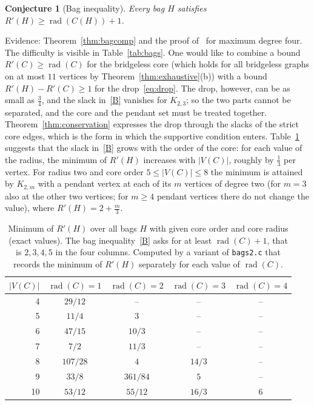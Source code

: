 \documentclass[11pt]{amsart}
\newtheorem{conjecture}[theorem]{Conjecture}
\theoremstyle{definition}
\DeclareMathOperator{\rad}{rad}
\newcommand{\Rp}{R'}
\begin{document}
\begin{conjecture}[Bag inequality]\label{conj:bag}
Every bag $H$ satisfies $\Rp(H)\ge\rad(C(H))+1$.
\end{conjecture}

Evidence: Theorem~\ref{thm:bagcomp} and the proof of~\cite{CPS} for maximum degree four. The difficulty is visible in
Table~\ref{tab:bags}. One would like to combine a bound $\Rp(C)\ge\rad(C)$ for the bridgeless core (which holds for all
bridgeless graphs on at most $11$ vertices by Theorem~\ref{thm:exhaustive}(b)) with a bound $\Rp(H)-\Rp(C)\ge1$ for the
drop~\eqref{eq:drop}. The drop, however, can be as small as $\frac34$, and the slack in~\eqref{B} vanishes for
$K_{2,3}$; so the two parts cannot be separated, and the core and the pendant set must be treated together.
Theorem~\ref{thm:conservation} expresses the drop through the slacks of the strict core edges, which is the form in which
the supportive condition enters.
Table~\ref{tab:byrad} suggests that the slack in~\eqref{B} grows with the order of the core: for each value of the radius,
the minimum of $\Rp(H)$ increases with $|V(C)|$, roughly by $\frac13$ per vertex. For radius two and core order
$5\le|V(C)|\le8$ the minimum is attained by $K_{2,m}$ with a pendant vertex at each of its $m$ vertices of degree two
(for $m=3$ also at the other two vertices; for $m\ge4$ pendant vertices there do not change the value), where
$\Rp(H)=2+\frac m3$.

\begin{table}[ht]
\centering
\small
\begin{tabular}{rcccc}
\toprule
$|V(C)|$ & $\rad(C)=1$ & $\rad(C)=2$ & $\rad(C)=3$ & $\rad(C)=4$\\
\midrule
4 & $29/12$ & -- & -- & --\\
5 & $11/4$ & $3$ & -- & --\\
6 & $47/15$ & $10/3$ & -- & --\\
7 & $7/2$ & $11/3$ & -- & --\\
8 & $107/28$ & $4$ & $14/3$ & --\\
9 & $33/8$ & $361/84$ & $5$ & --\\
10 & $53/12$ & $55/12$ & $16/3$ & $6$\\
\bottomrule
\end{tabular}
\medskip
\caption{Minimum of $\Rp(H)$ over all bags $H$ with given core order and core radius (exact values). The bag
inequality~\eqref{B} asks for at least $\rad(C)+1$, that is $2,3,4,5$ in the four columns. Computed by a variant of
\texttt{bags2.c} that records the minimum of $\Rp(H)$ separately for each value of $\rad(C)$.}\label{tab:byrad}
\end{table}
\end{document}

